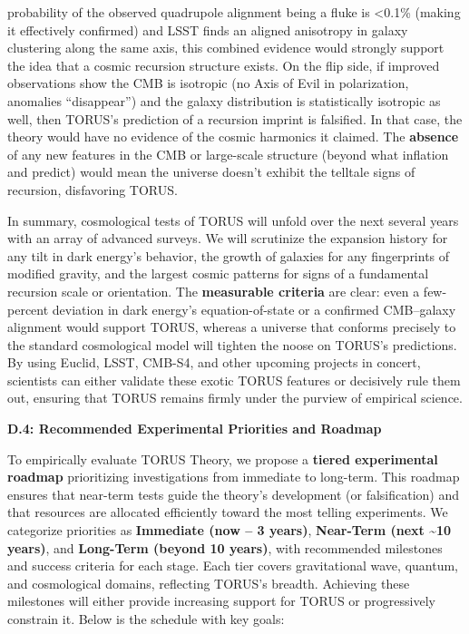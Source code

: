 \documentclass[
]{article}
\begin{document}
{\begin{itemize}
\begin{itemize}
    probability of the observed quadrupole alignment being a fluke is
    \textless0.1\% (making it effectively confirmed) and LSST finds an
    aligned anisotropy in galaxy clustering along the same axis, this
    combined evidence would strongly support the idea that a cosmic
    recursion structure exists\hspace{0pt}. On the flip side, if
    improved observations show the CMB is isotropic (no Axis of Evil in
    polarization, anomalies ``disappear'') and the galaxy distribution
    is statistically isotropic as well, then TORUS's prediction of a
    recursion imprint is falsified\hspace{0pt}. In that case, the theory
    would have no evidence of the cosmic harmonics it claimed. The
    \textbf{absence} of any new features in the CMB or large-scale
    structure (beyond what inflation and \LambdaCDM predict) would mean the
    universe doesn't exhibit the telltale signs of recursion,
    disfavoring TORUS.
  \end{itemize}
\end{itemize}

In summary, cosmological tests of TORUS will unfold over the next
several years with an array of advanced surveys. We will scrutinize the
expansion history for any tilt in dark energy's behavior, the growth of
galaxies for any fingerprints of modified gravity, and the largest
cosmic patterns for signs of a fundamental recursion scale or
orientation. The \textbf{measurable criteria} are clear: even a
few-percent deviation in dark energy's equation-of-state or a confirmed
CMB--galaxy alignment would support TORUS, whereas a universe that
conforms precisely to the standard cosmological model will tighten the
noose on TORUS's predictions. By using Euclid, LSST, CMB-S4, and other
upcoming projects in concert, scientists can either validate these
exotic TORUS features or decisively rule them out, ensuring that TORUS
remains firmly under the purview of empirical science.

\textbf{D.4: Recommended Experimental Priorities and Roadmap}

To empirically evaluate TORUS Theory, we propose a \textbf{tiered
experimental roadmap} prioritizing investigations from immediate to
long-term. This roadmap ensures that near-term tests guide the theory's
development (or falsification) and that resources are allocated
efficiently toward the most telling experiments. We categorize
priorities as \textbf{Immediate (now -- 3 years)}, \textbf{Near-Term
(next \textasciitilde10 years)}, and \textbf{Long-Term (beyond 10
years)}, with recommended milestones and success criteria for each
stage. Each tier covers gravitational wave, quantum, and cosmological
domains, reflecting TORUS's breadth. Achieving these milestones will
either provide increasing support for TORUS or progressively constrain
it. Below is the schedule with key goals:

}
\end{document}
